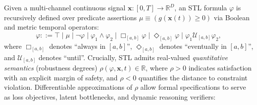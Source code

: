 Given a multi-channel continuous signal $\mathbf{x}: [0, T] \to \mathbb{R}^D$, an STL formula $\varphi$ is recursively defined over predicate assertions $\mu \equiv (g(\mathbf{x}(t)) \ge 0)$ via Boolean and metric temporal operators:
\begin{equation}
    \varphi ::= \top \mid \mu \mid \neg \varphi \mid \varphi_1 \wedge \varphi_2 \mid \Box_{[a,b]} \varphi \mid \Diamond_{[a,b]} \varphi \mid \varphi_1 \mathcal{U}_{[a,b]} \varphi_2,
\end{equation}
where $\Box_{[a,b]}$ denotes ``always in $[a,b]$'', $\Diamond_{[a,b]}$ denotes ``eventually in $[a,b]$'', and $\mathcal{U}_{[a,b]}$ denotes ``until''. Crucially, STL admits real-valued \emph{quantitative semantics} (robustness degrees) $\rho(\varphi, \mathbf{x}, t) \in \mathbb{R}$, where $\rho > 0$ indicates satisfaction with an explicit margin of safety, and $\rho < 0$ quantifies the distance to constraint violation. Differentiable approximations of $\rho$ allow formal specifications to serve as loss objectives, latent bottlenecks, and dynamic reasoning verifiers:
